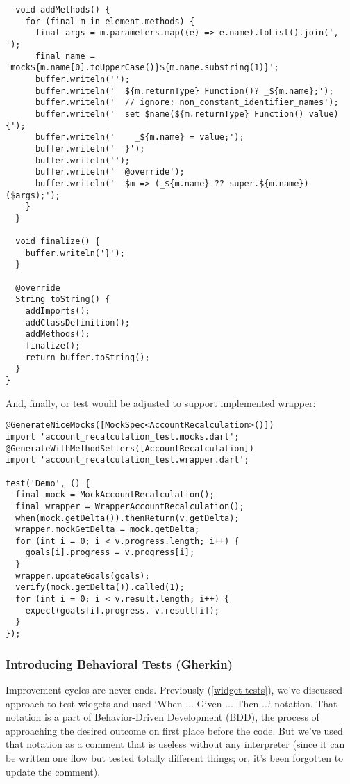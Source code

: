 \begin{lstlisting}
  void addMethods() {
    for (final m in element.methods) {
      final args = m.parameters.map((e) => e.name).toList().join(', ');
      final name = 'mock${m.name[0].toUpperCase()}${m.name.substring(1)}';
      buffer.writeln('');
      buffer.writeln('  ${m.returnType} Function()? _${m.name};');
      buffer.writeln('  // ignore: non_constant_identifier_names');
      buffer.writeln('  set $name(${m.returnType} Function() value) {');
      buffer.writeln('    _${m.name} = value;');
      buffer.writeln('  }');
      buffer.writeln('');
      buffer.writeln('  @override');
      buffer.writeln('  $m => (_${m.name} ?? super.${m.name})($args);');
    }
  }

  void finalize() {
    buffer.writeln('}');
  }

  @override
  String toString() {
    addImports();
    addClassDefinition();
    addMethods();
    finalize();
    return buffer.toString();
  }
}
\end{lstlisting}

\noindent And, finally, or test would be adjusted to support implemented wrapper:

\begin{lstlisting}
@GenerateNiceMocks([MockSpec<AccountRecalculation>()])
import 'account_recalculation_test.mocks.dart';
@GenerateWithMethodSetters([AccountRecalculation])
import 'account_recalculation_test.wrapper.dart';

test('Demo', () {
  final mock = MockAccountRecalculation();
  final wrapper = WrapperAccountRecalculation();
  when(mock.getDelta()).thenReturn(v.getDelta);
  wrapper.mockGetDelta = mock.getDelta;
  for (int i = 0; i < v.progress.length; i++) {
    goals[i].progress = v.progress[i];
  }
  wrapper.updateGoals(goals);
  verify(mock.getDelta()).called(1);
  for (int i = 0; i < v.result.length; i++) {
    expect(goals[i].progress, v.result[i]);
  }
});
\end{lstlisting}


\subsubsection{Introducing Behavioral Tests (Gherkin)}

Improvement cycles are never ends. Previously (\ref{widget-tests}), we've discussed approach to test widgets and used 
`When ... Given ... Then ...`-notation. That notation is a part of Behavior-Driven Development (BDD), the process
of approaching the desired outcome on first place before the code. But we've used that notation as a comment that is 
useless without any interpreter (since it can be written one flow but tested totally different things; or, it's been 
forgotten to update the comment).

